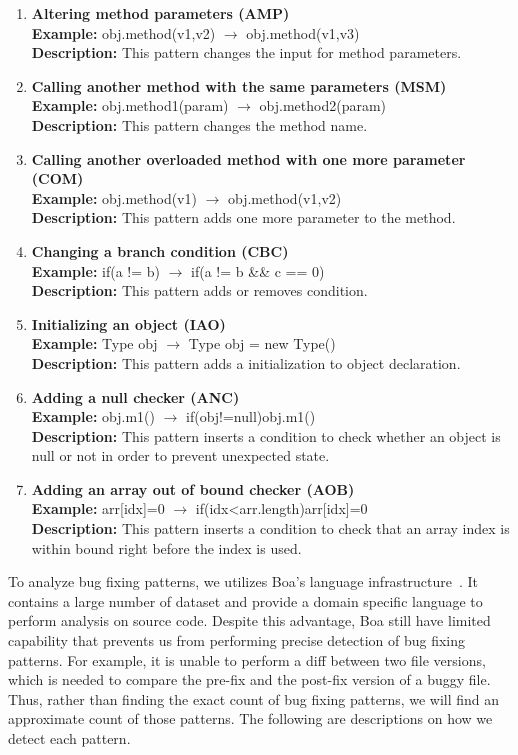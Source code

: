 \documentclass{sig-alternate-05-2015}
\begin{document}
\begin{enumerate}
	\item {\bf Altering method parameters (AMP)}\\
	{\bf Example:} obj.method(v1,v2) $\rightarrow$ obj.method(v1,v3)\\
	{\bf Description:} This pattern changes the input for method parameters.
	\item {\bf Calling another method with the same parameters (MSM)}\\
	{\bf Example:} obj.method1(param) $\rightarrow$ obj.method2(param)\\
	{\bf Description:} This pattern changes the method name.
	\item {\bf Calling another overloaded method with one more parameter (COM)}\\
	{\bf Example:} obj.method(v1) $\rightarrow$ obj.method(v1,v2)\\
	{\bf Description:} This pattern adds one more parameter to the method.
	\item {\bf Changing a branch condition (CBC)}\\
	{\bf Example:} if(a != b) $\rightarrow$ if(a != b \&\& c == 0)\\
	{\bf Description:} This pattern adds or removes condition.
	\item {\bf Initializing an object (IAO)}\\
	{\bf Example:} Type obj $\rightarrow$ Type obj = new Type()\\
	{\bf Description:} This pattern adds a initialization to object declaration.
	\item {\bf Adding a null checker (ANC)}\\
	{\bf Example:} obj.m1() $\rightarrow$ if(obj!=null){obj.m1()}\\
	{\bf Description:} This pattern inserts a condition to check whether an object is null or not in order to prevent unexpected state.
	\item {\bf Adding an array out of bound checker (AOB)}\\
	{\bf Example:} arr[idx]=0 $\rightarrow$ if(idx<arr.length){arr[idx]=0}\\
	{\bf Description:} This pattern inserts a condition to check that an array index is within bound right before the index is used.
\end{enumerate}

To analyze bug fixing patterns, we utilizes Boa's language
infrastructure~\cite{robert}. It contains a large number of dataset and provide
a domain specific language to perform analysis on source code. Despite this
advantage, Boa still have limited capability that prevents us from performing
precise detection of bug fixing patterns. For example, it is unable to perform a
diff between two file versions, which is needed to compare the pre-fix and the
post-fix version of a buggy file. Thus, rather than finding the exact count of
bug fixing patterns, we will find an approximate count of those patterns. The
following are descriptions on how we detect each pattern.
\end{document}
